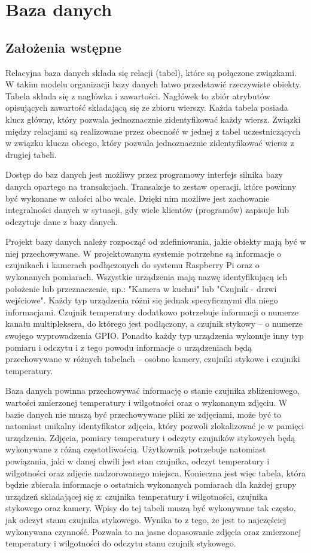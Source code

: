 \documentclass[a4paper,11pt,twoside]{article}
\begin{document}
\section{Baza danych}
\subsection{Założenia wstępne}
Relacyjna baza danych składa się relacji (tabel), które są połączone związkami. W takim modelu organizacji bazy danych łatwo przedstawić rzeczywiste obiekty. Tabela składa się z nagłówka i zawartości. Nagłówek to zbiór atrybutów opisujących zawartość składającą się ze zbioru wierszy. Każda tabela posiada klucz główny, który pozwala jednoznacznie zidentyfikować każdy wiersz. Związki między relacjami są realizowane przez obecność w jednej z tabel uczestniczących w związku klucza obcego, który pozwala jednoznacznie zidentyfikować wiersz z drugiej tabeli.

Dostęp do baz danych jest możliwy przez programowy interfejs silnika bazy danych opartego na transakcjach. Transakcje to zestaw operacji, które powinny być wykonane w całości albo wcale. Dzięki nim możliwe jest zachowanie integralności danych w sytuacji, gdy wiele klientów (programów) zapisuje lub odczytuje dane z bazy danych.

Projekt bazy danych należy rozpocząć od zdefiniowania, jakie obiekty mają być w niej przechowywane. W projektowanym systemie potrzebne są informacje o czujnikach i kamerach podłączonych do systemu Raspberry Pi oraz o wykonanych pomiarach. Wszystkie urządzenia mają nazwę identyfikującą ich położenie lub przeznaczenie, np.: "Kamera w kuchni" lub "Czujnik - drzwi wejściowe". Każdy typ urządzenia różni się jednak specyficznymi dla niego informacjami. Czujnik temperatury dodatkowo potrzebuje informacji o numerze kanału multipleksera, do którego jest podłączony, a czujnik stykowy -- o numerze swojego wyprowadzenia GPIO. Ponadto każdy typ urządzenia wykonuje inny typ pomiaru i odczytu i z tego powodu informacje o urządzeniach będą przechowywane w różnych tabelach -- osobno kamery, czujniki stykowe i czujniki temperatury.

Baza danych powinna przechowywać informację o stanie czujnika zbliżeniowego, wartości zmierzonej temperatury i wilgotności oraz o wykonanym zdjęciu. W bazie danych nie muszą być przechowywane pliki ze zdjęciami, może być to natomiast unikalny identyfikator zdjęcia, który pozwoli zlokalizować je w pamięci urządzenia. Zdjęcia, pomiary temperatury i odczyty czujników stykowych będą wykonywane z różną częstotliwością. Użytkownik potrzebuje natomiast powiązania, jaki w danej chwili jest stan czujnika, odczyt temperatury i wilgotności oraz zdjęcie nadzorowanego miejsca. Konieczna jest więc tabela, która będzie zbierała informacje o ostatnich wykonanych pomiarach dla każdej grupy urządzeń składającej się z: czujnika temperatury i wilgotności, czujnika stykowego oraz kamery. Wpisy do tej tabeli muszą być wykonywane tak często, jak odczyt stanu czujnika stykowego. Wynika to z tego, że jest to najczęściej wykonywana czynność. Pozwala to na jasne dopasowanie zdjęcia oraz zmierzonej temperatury i wilgotności do odczytu stanu czujnik stykowego.
\end{document}
